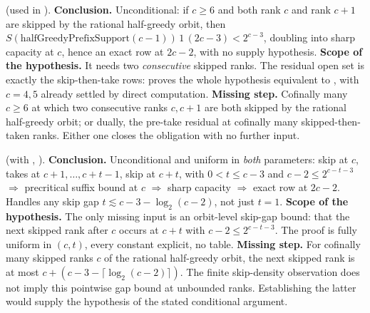 \begin{obs}
(used in ).
\textbf{Conclusion.} Unconditional: if $c \ge 6$ and both rank $c$ and rank $c{+}1$ are skipped by
the rational half-greedy orbit, then $\ensuremath{S}(\mathrm{halfGreedyPrefixSupport}
(c{-}1))\,1\,(2c{-}3) < 2^{c-3}$, doubling into sharp capacity at $c$, hence an exact row at
$2c{-}2$, with no supply hypothesis.
\textbf{Scope of the hypothesis.} It needs two \emph{consecutive} skipped ranks.
The residual open set is exactly the skip-then-take rows:
proves the whole hypothesis equivalent to
,
with $c=4,5$ already settled by direct computation.
\textbf{Missing step.} Cofinally many $c \ge 6$ at which two consecutive ranks $c,c{+}1$ are both
skipped by the rational half-greedy orbit; or dually, the pre-take residual at cofinally many
skipped-then-taken ranks. Either one closes the obligation with no further input.
\end{obs}

\begin{obs}
(with ,
).
\textbf{Conclusion.} Unconditional and uniform in \emph{both} parameters: skip at $c$, takes at
$c{+}1,\dots,c{+}t{-}1$, skip at $c{+}t$, with $0<t\le c-3$ and $c-2\le 2^{c-t-3}$
$\Rightarrow$ precritical suffix bound at $c$ $\Rightarrow$ sharp capacity $\Rightarrow$ exact
row at $2c{-}2$. Handles any skip gap $t \lesssim c-3-\log_2(c-2)$, not just $t=1$.
\textbf{Scope of the hypothesis.} The only missing input is an orbit-level
skip-gap bound: that the next skipped rank after $c$ occurs at $c{+}t$ with $c-2 \le
2^{c-t-3}$. The proof is fully uniform in $(c,t)$, every constant explicit, no table.
\textbf{Missing step.} For cofinally many skipped ranks $c$ of the rational half-greedy orbit, the
next skipped rank is at most $c+(c-3-\lceil\log_2(c-2)\rceil)$.
The finite skip-density observation does not imply this pointwise gap
bound at unbounded ranks.  Establishing the latter would supply the
hypothesis of the stated conditional argument.
\end{obs}


